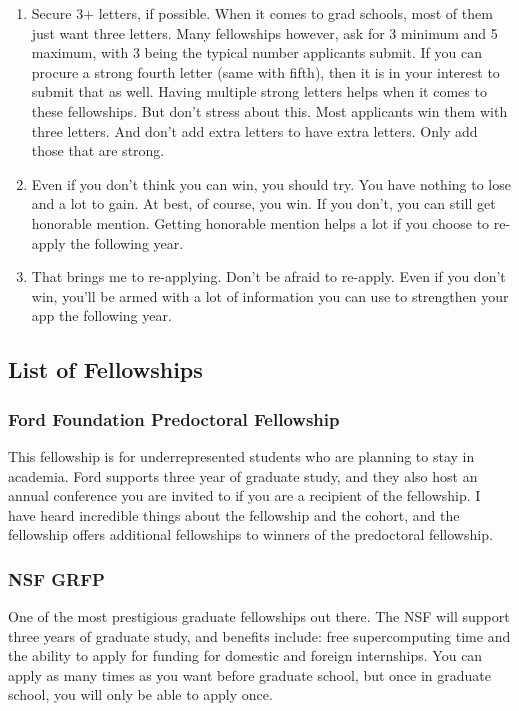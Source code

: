\documentclass[12pt]{article}
\begin{document}
\begin{enumerate}
\item Secure 3+ letters, if possible. When it comes to grad schools, most of them just want three letters. Many fellowships however, ask for 3 minimum and 5 maximum, with 3 being the typical number applicants submit. If you can procure a strong fourth letter (same with fifth), then it is in your interest to submit that as well. Having multiple strong letters helps when it comes to these fellowships. But don’t stress about this. Most applicants win them with three letters. And don’t add extra letters to have extra letters. Only add those that are strong.


\item Even if you don't think you can win, you should try. You have nothing to lose and a lot to gain. At best, of course, you win. If you don't, you can still get honorable mention. Getting honorable mention helps a lot if you choose to re-apply the following year. 

\item That brings me to re-applying. Don't be afraid to re-apply. Even if you don't win, you'll be armed with a lot of information you can use to strengthen your app the following year.
\end{enumerate}
\subsection{List of Fellowships}

\subsubsection{Ford Foundation Predoctoral Fellowship}

This fellowship is for underrepresented students who are planning to stay in academia. Ford supports three year of graduate study, and they also host an annual conference you are invited to if you are a recipient of the fellowship. I have heard incredible things about the fellowship and the cohort, and the fellowship offers additional fellowships to winners of the predoctoral fellowship.

\subsubsection{NSF GRFP}

One of the most prestigious graduate fellowships out there. The NSF will support three years of graduate study, and benefits include: free supercomputing time and the ability to apply for funding for domestic and foreign internships. You can apply as many times as you want before graduate school, but once in graduate school, you will only be able to apply once.
\end{document}
